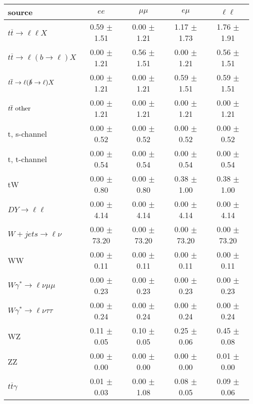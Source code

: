 \begin{tabular}{l|cccc} \hline\hline
source & $ee$ & $\mu\mu$ & $e\mu$ & $\ell\ell $ \\
\hline
$t\overline{t} \rightarrow \ell \ell X$ &  0.59 $\pm$  1.51 &  0.00 $\pm$  1.21 &  1.17 $\pm$  1.73 &  1.76 $\pm$  1.91 \\
$t\overline{t} \rightarrow \ell (b \rightarrow \ell) X$ &  0.00 $\pm$  1.21 &  0.56 $\pm$  1.51 &  0.00 $\pm$  1.21 &  0.56 $\pm$  1.51 \\
$t\overline{t} \rightarrow \ell (\slashed b \rightarrow \ell) X$ &  0.00 $\pm$  1.21 &  0.00 $\pm$  1.21 &  0.59 $\pm$  1.51 &  0.59 $\pm$  1.51 \\
        $t\overline{t}\ \rm{other}$ &  0.00 $\pm$  1.21 &  0.00 $\pm$  1.21 &  0.00 $\pm$  1.21 &  0.00 $\pm$  1.21 \\
\hline
                       t, s-channel &  0.00 $\pm$  0.52 &  0.00 $\pm$  0.52 &  0.00 $\pm$  0.52 &  0.00 $\pm$  0.52 \\
                       t, t-channel &  0.00 $\pm$  0.54 &  0.00 $\pm$  0.54 &  0.00 $\pm$  0.54 &  0.00 $\pm$  0.54 \\
                                 tW &  0.00 $\pm$  0.80 &  0.00 $\pm$  0.80 &  0.38 $\pm$  1.00 &  0.38 $\pm$  1.00 \\
\hline
         $DY \rightarrow \ell \ell$ &  0.00 $\pm$  4.14 &  0.00 $\pm$  4.14 &  0.00 $\pm$  4.14 &  0.00 $\pm$  4.14 \\
      $W+jets \rightarrow \ell \nu$ &  0.00 $\pm$ 73.20 &  0.00 $\pm$ 73.20 &  0.00 $\pm$ 73.20 &  0.00 $\pm$ 73.20 \\
                                 WW &  0.00 $\pm$  0.11 &  0.00 $\pm$  0.11 &  0.00 $\pm$  0.11 &  0.00 $\pm$  0.11 \\
\hline
$W\gamma^{*} \rightarrow \ell \nu \mu\mu$ &  0.00 $\pm$  0.23 &  0.00 $\pm$  0.23 &  0.00 $\pm$  0.23 &  0.00 $\pm$  0.23 \\
$W\gamma^{*} \rightarrow \ell \nu \tau\tau$ &  0.00 $\pm$  0.24 &  0.00 $\pm$  0.24 &  0.00 $\pm$  0.24 &  0.00 $\pm$  0.24 \\
                                 WZ &  0.11 $\pm$  0.05 &  0.10 $\pm$  0.05 &  0.25 $\pm$  0.06 &  0.45 $\pm$  0.08 \\
                                 ZZ &  0.00 $\pm$  0.00 &  0.00 $\pm$  0.00 &  0.00 $\pm$  0.00 &  0.01 $\pm$  0.00 \\
\hline
              $t\overline{t}\gamma$ &  0.01 $\pm$  0.03 &  0.00 $\pm$  1.08 &  0.08 $\pm$  0.05 &  0.09 $\pm$  0.06 \\

\end{tabular}
